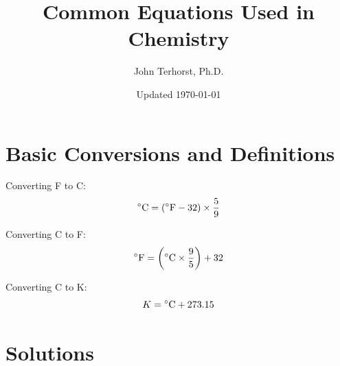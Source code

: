 \documentclass[10pt]{article}
\title{Common Equations Used in Chemistry}
\author{John Terhorst, Ph.D.}
\date{Updated \today}
\begin{document}

\maketitle
\tableofcontents


\newpage\section{Basic Conversions and Definitions}

Converting \deg F to \deg C:
\begin{equation*}
\textnormal{\deg C} = (\textnormal{\deg F}-32)\times \frac{5}{9}
\end{equation*}

Converting \deg C to \deg F:
\begin{equation*}
\textnormal{\deg F} = \left(\textnormal{\deg C}\times \frac{9}{5}\right) +32
\end{equation*}

Converting \deg C to K:
\begin{equation*}
K = \textnormal{\deg C}+273.15
\end{equation*}


\section{Solutions}
\end{document}
